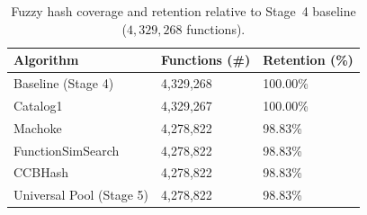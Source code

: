 \begin{table}
\caption{Fuzzy hash coverage and retention relative to Stage~4 baseline ($4,329,268$ functions).}
\label{tab:hash-coverage}
\begin{tabular}{lll}
\toprule
Algorithm & Functions (\#) & Retention (\%) \\
\midrule
Baseline (Stage 4) & 4,329,268 & 100.00\% \\
Catalog1 & 4,329,267 & 100.00\% \\
Machoke & 4,278,822 & 98.83\% \\
FunctionSimSearch & 4,278,822 & 98.83\% \\
CCBHash & 4,278,822 & 98.83\% \\
Universal Pool (Stage 5) & 4,278,822 & 98.83\% \\
\bottomrule
\end{tabular}
\end{table}
